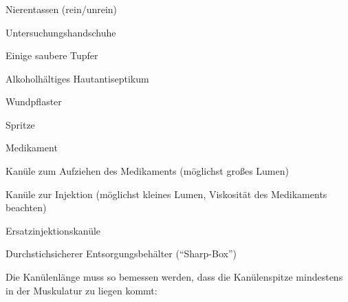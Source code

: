 \subsubsection{}

\begin{FamPropMaterial}
\begin{compactenum}
  \item Nierentassen (rein/unrein)
  \item Untersuchungshandschuhe
  \item Einige saubere Tupfer
  \item Alkoholhältiges
  Hautantiseptikum
  \item Wundpflaster
  \item Spritze
  \item Medikament
  \item Kanüle zum
  Aufziehen des Medikaments (möglichst großes Lumen)
  \item Kanüle zur Injektion (möglichst kleines
  Lumen, Viskosität des Medikaments beachten)
  \item Ersatzinjektionskanüle
  \item Durchstichsicherer
  Entsorgungsbehälter (\enquote{Sharp-Box})
\end{compactenum}
\end{FamPropMaterial}




Die Kanülenlänge muss so bemessen werden, dass die
Kanülenspitze mindestens  in der Muskulatur zu liegen kommt:



\subsubsection{}

